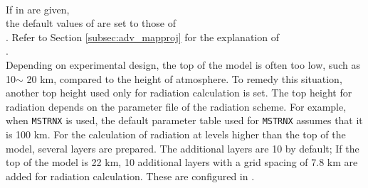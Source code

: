 \\

If  in  are given,\\
the default values of  are set to those of \\
.
Refer to Section \ref{subsec:adv_mapproj} for the explanation of \\
.\\

Depending on experimental design, the top of the model is often too low, such as 10$\sim$ 20 km, compared to the height of atmosphere.
To remedy this situation, another top height used only for radiation calculation is set.
The top height for radiation depends on the parameter file of the radiation scheme.
For example, when \verb|MSTRNX| is used, the default parameter table used for \verb|MSTRNX| assumes that it is 100 km.
%
For the calculation of radiation at levels higher than the top of the model, several layers are prepared.
The additional layers are 10 by default;
If the top of the model is 22 km, 10 additional layers with a grid spacing of 7.8 km are added for radiation calculation.
These are configured in .\\

